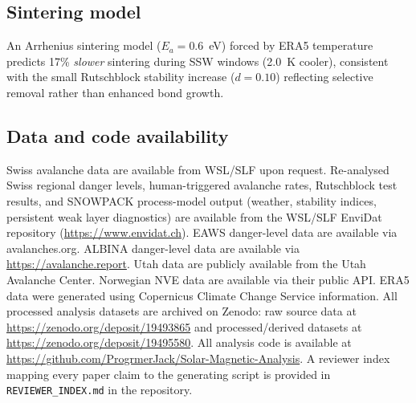 \documentclass[11pt,letterpaper]{article}
\begin{document}
\subsection*{Sintering model}

An Arrhenius sintering model\cite{Hobbs1974,Colbeck1997} ($E_a = 0.6$~eV) forced by ERA5 temperature predicts 17\% \emph{slower} sintering during SSW windows (2.0~K cooler), consistent with the small Rutschblock stability increase ($d = 0.10$) reflecting selective removal rather than enhanced bond growth.

\subsection*{Data and code availability}

Swiss avalanche data are available from WSL/SLF upon request. Re-analysed Swiss regional danger levels, human-triggered avalanche rates, Rutschblock test results, and SNOWPACK process-model output (weather, stability indices, persistent weak layer diagnostics) are available from the WSL/SLF EnviDat repository (\url{https://www.envidat.ch}). EAWS danger-level data are available via avalanches.org. ALBINA danger-level data are available via \url{https://avalanche.report}. Utah data are publicly available from the Utah Avalanche Center. Norwegian NVE data are available via their public API. ERA5 data were generated using Copernicus Climate Change Service information. All processed analysis datasets are archived on Zenodo: raw source data at \url{https://zenodo.org/deposit/19493865} and processed/derived datasets at \url{https://zenodo.org/deposit/19495580}. All analysis code is available at \url{https://github.com/ProgrmerJack/Solar-Magnetic-Analysis}. A reviewer index mapping every paper claim to the generating script is provided in \texttt{REVIEWER\_INDEX.md} in the repository.
\end{document}
